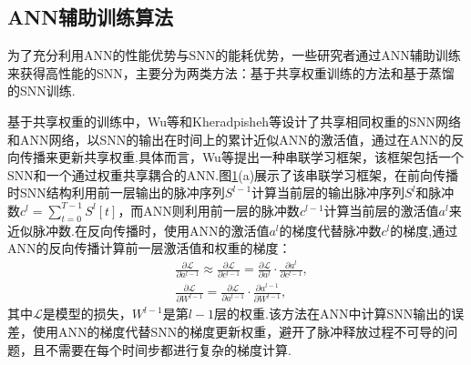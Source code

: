 \documentclass{SCIS2020cn}
\begin{document}
\subsection{ANN辅助训练算法}
为了充分利用ANN的性能优势与SNN的能耗优势，一些研究者通过ANN辅助训练来获得高性能的SNN，主要分为两类方法：基于共享权重训练的方法和基于蒸馏的SNN训练.
\begin{figure}
    \centering
    \label{fig:assist}
\end{figure}

基于共享权重的训练中，Wu等\cite{wu2021tandem}和Kheradpisheh等\cite{kheradpisheh2022spiking}设计了共享相同权重的SNN网络和ANN网络，以SNN的输出在时间上的累计近似ANN的激活值，通过在ANN的反向传播来更新共享权重.具体而言，Wu等\cite{wu2021tandem}提出一种串联学习框架，该框架包括一个SNN和一个通过权重共享耦合的ANN.图\ref{fig:assist}(a)展示了该串联学习框架，在前向传播时SNN结构利用前一层输出的脉冲序列$S^{l-1}$计算当前层的输出脉冲序列$S^l$和脉冲数$c^l=\sum_{t=0}^{T-1} S^l[t]$，而ANN则利用前一层的脉冲数$c^{l-1}$计算当前层的激活值$a^l$来近似脉冲数.在反向传播时，使用ANN的激活值$a^l$的梯度代替脉冲数$c^l$的梯度,通过ANN的反向传播计算前一层激活值和权重的梯度：
\begin{align}
    &\frac{\partial \mathcal{L}}{\partial a^{l-1}} \approx \frac{\partial \mathcal{L}}{\partial c^{l-1}} = \frac{\partial \mathcal{L}}{\partial a^l} \cdot \frac{\partial a^l}{\partial c^{l-1}},\\
    &\frac{\partial \mathcal{L}}{\partial W^{l-1}} =  \frac{\partial \mathcal{L}}{\partial a^{l-1}} \cdot \frac{\partial a^{l-1}}{\partial W^{l-1}},
\end{align}
其中$\mathcal{L}$是模型的损失，$W^{l-1}$是第$l-1$层的权重.该方法在ANN中计算SNN输出的误差，使用ANN的梯度代替SNN的梯度更新权重，避开了脉冲释放过程不可导的问题，且不需要在每个时间步都进行复杂的梯度计算.
\end{document}
